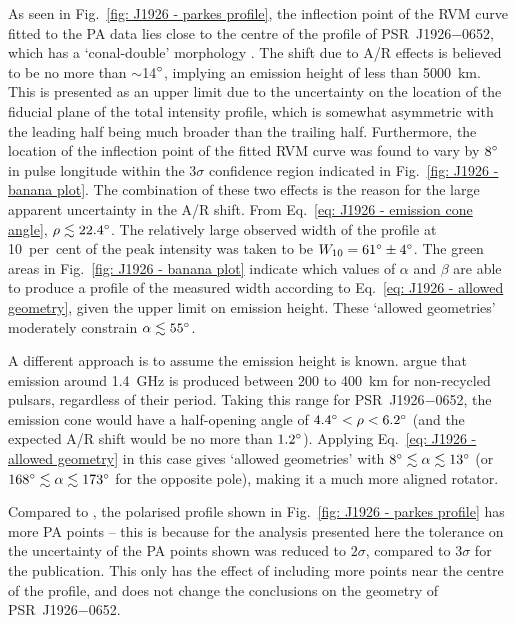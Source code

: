 As seen in Fig.~\ref{fig: J1926 - parkes profile}, the inflection point of the RVM curve fitted to the PA data lies close to the centre of the profile of PSR~J1926$-$0652, which has a `conal-double' morphology \citep[][]{Rxxx1983a}. The shift due to A/R effects is believed to be no more than $\sim$14$^\circ$, implying an emission height of less than 5000~km. This is presented as an upper limit due to the uncertainty on the location of the fiducial plane of the total intensity profile, which is somewhat asymmetric with the leading half being much broader than the trailing half. Furthermore, the location of the inflection point of the fitted RVM curve was found to vary by $8^\circ$ in pulse longitude within the $3\sigma$ confidence region indicated in Fig.~\ref{fig: J1926 - banana plot}. The combination of these two effects is the reason for the large apparent uncertainty in the A/R shift. From Eq.~\eqref{eq: J1926 - emission cone angle}, $\rho \lesssim 22.4^\circ$. The relatively large observed width of the profile at 10~per~cent of the peak intensity was taken to be $W_{10} = 61^\circ\pm 4^\circ$. The green areas in Fig.~\ref{fig: J1926 - banana plot} indicate which values of $\alpha$ and $\beta$ are able to produce a profile of the measured width according to Eq.~\eqref{eq: J1926 - allowed geometry}, given the upper limit on emission height. These `allowed geometries' moderately constrain $\alpha \lesssim 55^\circ$.

A different approach is to assume the emission height is known. \citet{JKxx2019} argue that emission around 1.4~GHz is produced between 200 to 400~km for non-recycled pulsars, regardless of their period. Taking this range for PSR~J1926$-$0652, the emission cone would have a half-opening angle of $4.4^\circ < \rho < 6.2^\circ$ (and the expected A/R shift would be no more than $1.2^\circ$). Applying Eq.~\eqref{eq: J1926 - allowed geometry} in this case gives `allowed geometries' with $8^\circ \lesssim \alpha \lesssim 13^\circ$ (or $168^\circ \lesssim \alpha \lesssim 173^\circ$ for the opposite pole), making it a much more aligned rotator. 


Compared to \citet{ZLH+2019}, the polarised profile shown in Fig.~\ref{fig: J1926 - parkes profile} has more PA points -- this is because for the analysis presented here the tolerance on the uncertainty of the PA points shown was reduced to $2\sigma$, compared to $3\sigma$ for the publication. This only has the effect of including more points near the centre of the profile, and does not change the conclusions on the geometry of PSR~J1926$-$0652.





